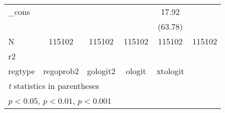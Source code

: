 {\begin{tabular}{l*{5}{c}}
\_cons      &                     &                     &                     &       17.92\sym{***}&                     \\
            &                     &                     &                     &     (63.78)         &                     \\
\hline
N           &      115102         &      115102         &      115102         &      115102         &      115102         \\
r2          &                     &                     &                     &                     &                     \\
regtype     &   regoprob2         &    gologit2         &      ologit         &    xtologit         &                     \\
\hline\hline
\multicolumn{6}{l}{\footnotesize \textit{t} statistics in parentheses}\\
\multicolumn{6}{l}{\footnotesize \sym{*} \(p<0.05\), \sym{**} \(p<0.01\), \sym{***} \(p<0.001\)}\\
\end{tabular}
}
